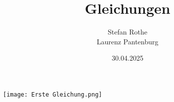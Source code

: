 \documentclass[parskip=half]{scrartcl}
\title{Gleichungen}
\author{Stefan Rothe\\
Laurenz Pantenburg}
\date{30.04.2025}
\begin{document}
  \maketitle
  \thispagestyle{firstpage}
  \begin{center}
    \vspace{5mm}

    \texttt{[image: Erste Gleichung.png]}
  \end{center}
  \tableofcontents
  \clearpage

  
  
  
  
  
\end{document}
